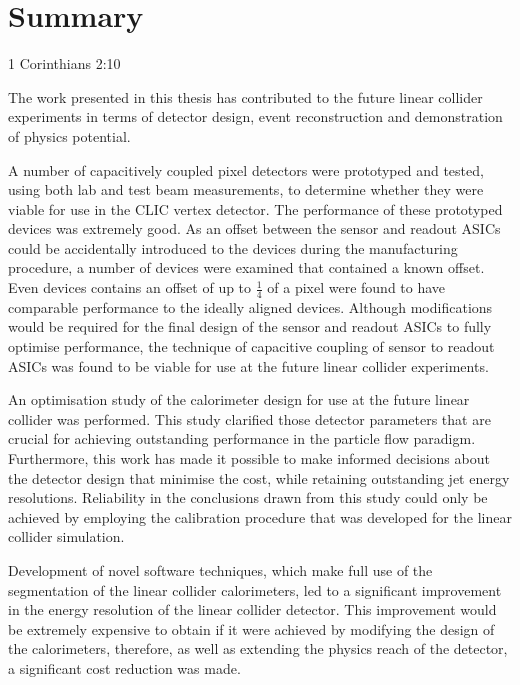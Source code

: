 \chapter{Summary}
\label{chap:summary}

{1 Corinthians 2:10}



The work presented in this thesis has contributed to the future linear collider experiments in terms of detector design, event reconstruction and demonstration of physics potential.  

A number of capacitively coupled pixel detectors were prototyped and tested, using both lab and test beam measurements, to determine whether they were viable for use in the CLIC vertex detector.  The performance of these prototyped devices was extremely good.  As an offset between the sensor and readout ASICs could be accidentally introduced to the devices during the manufacturing procedure, a number of devices were examined that contained a known offset.  Even devices contains an offset of up to $\frac{1}{4}$ of a pixel were found to have comparable performance to the ideally aligned devices.  Although modifications would be required for the final design of the sensor and readout ASICs to fully optimise performance, the technique of capacitive coupling of sensor to readout ASICs was found to be viable for use at the future linear collider experiments.  

An optimisation study of the calorimeter design for use at the future linear collider was performed.  This study clarified those detector parameters that are crucial for achieving outstanding performance in the particle flow paradigm.  Furthermore, this work has made it possible to make informed decisions about the detector design that minimise the cost, while retaining outstanding jet energy resolutions.  Reliability in the conclusions drawn from this study could only be achieved by employing the calibration procedure that was developed for the linear collider simulation.  

Development of novel software techniques, which make full use of the segmentation of the linear collider calorimeters, led to a significant improvement in the energy resolution of the linear collider detector.  This improvement would be extremely expensive to obtain if it were achieved by modifying the design of the calorimeters, therefore, as well as extending the physics reach of the detector, a significant cost reduction was made.   

